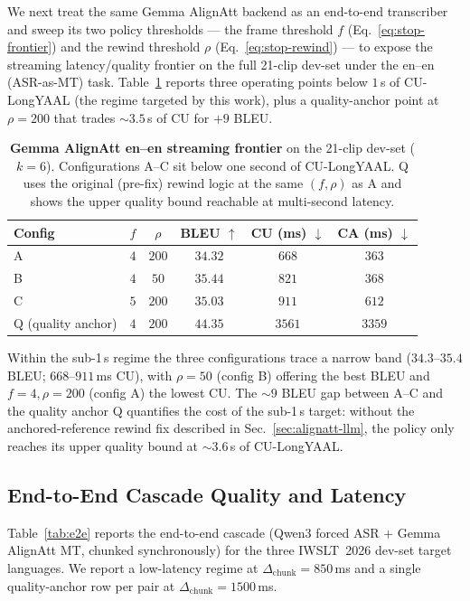 \documentclass[11pt,twocolumn]{article}
\begin{document}
We next treat the same Gemma AlignAtt backend as an end-to-end
transcriber and sweep its two policy thresholds --- the frame threshold
$f$ (Eq.~\eqref{eq:stop-frontier}) and the rewind threshold $\rho$
(Eq.~\eqref{eq:stop-rewind}) --- to expose the streaming latency/quality
frontier on the full 21-clip dev-set under the en--en (ASR-as-MT) task.
Table~\ref{tab:asr-frontier} reports three operating points below
$1$\,s of CU-LongYAAL (the regime targeted by this work), plus a
quality-anchor point at $\rho{=}200$ that trades ${\sim}3.5$\,s of
CU for ${+}9$ BLEU.

\begin{table}[t]
\centering
\small
\begin{tabular}{l c c c c c}
\toprule
Config & $f$ & $\rho$ & BLEU $\uparrow$ & CU (ms) $\downarrow$ & CA (ms) $\downarrow$ \\
\midrule
A       & $4$ & $200$ & $34.32$ & $668$ & $363$ \\
B       & $4$ & $50$  & $35.44$ & $821$ & $368$ \\
C       & $5$ & $200$ & $35.03$ & $911$ & $612$ \\
\midrule
Q (quality anchor) & $4$ & $200$ & $44.35$ & $3561$ & $3359$ \\
\bottomrule
\end{tabular}
\caption{\textbf{Gemma AlignAtt en--en streaming frontier} on the
21-clip dev-set ($k{=}6$). Configurations A--C sit below one second of
CU-LongYAAL. Q uses the original (pre-fix) rewind logic at the same
$(f,\rho)$ as A and shows the upper quality bound reachable at
multi-second latency.}
\label{tab:asr-frontier}
\end{table}

Within the sub-1\,s regime the three configurations trace a narrow
band ($34.3$--$35.4$ BLEU; $668$--$911$\,ms CU), with $\rho{=}50$
(config B) offering the best BLEU and $f{=}4, \rho{=}200$ (config A)
the lowest CU. The ${\sim}9$ BLEU gap between A--C and the quality
anchor Q quantifies the cost of the sub-1\,s target: without the
anchored-reference rewind fix described in Sec.~\ref{sec:alignatt-llm},
the policy only reaches its upper quality bound at ${\sim}3.6$\,s of
CU-LongYAAL.

\subsection{End-to-End Cascade Quality and Latency}
\label{sec:exp-e2e}

Table~\ref{tab:e2e} reports the end-to-end cascade (Qwen3 forced ASR
$+$ Gemma AlignAtt MT, chunked synchronously) for the three IWSLT~2026
dev-set target languages. We report a low-latency regime at
$\Delta_{\mathrm{chunk}}{=}850$\,ms and a single quality-anchor row
per pair at $\Delta_{\mathrm{chunk}}{=}1500$\,ms.
\end{document}
